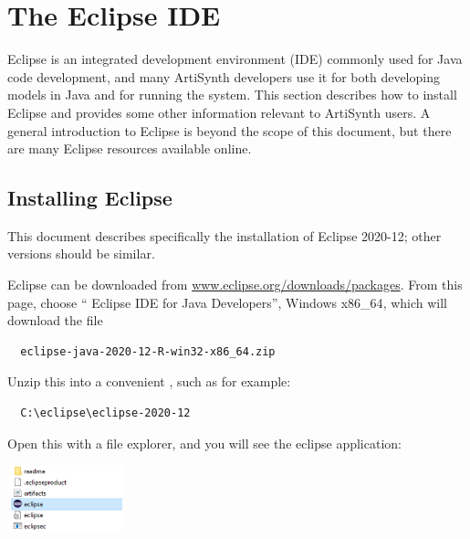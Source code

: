 \section{The Eclipse IDE}
\label{EclipseIDE}

Eclipse is an integrated development environment (IDE) commonly used
for Java code development, and many ArtiSynth developers use it for
both developing models in Java and for running the system. This
section describes how to install Eclipse and provides some other
information relevant to ArtiSynth users.  A general introduction to
Eclipse is beyond the scope of this document, but there are many
Eclipse resources available online.

\subsection{Installing Eclipse}
\label{InstallingEclipse}

This document describes specifically the installation of Eclipse
2020-12; other versions should be similar.

Eclipse can be downloaded from
\href{https://www.eclipse.org/downloads/packages}%
{www.eclipse.org/downloads/packages}. From this page, choose ``{\sf
Eclipse IDE for Java Developers}'',
\ifWindows
{\sf Windows x86\_64}, which will download the file
\begin{verbatim}
  eclipse-java-2020-12-R-win32-x86_64.zip
\end{verbatim}
Unzip this into a convenient \directory{}, such as for example:
\begin{verbatim}
  C:\eclipse\eclipse-2020-12
\end{verbatim}
Open this \directory{} with a file explorer, and you will see the eclipse
application:

\begin{center}
   \includegraphics[width=0.25\textwidth]{images/EclipseApp}
\end{center}

